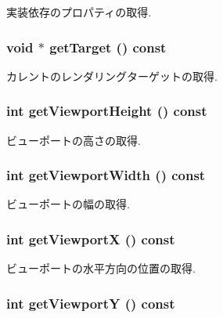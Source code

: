 実装依存のプロパティの取得. \hypertarget{classm3g_1_1Graphics3D_02d0033930c8e68f4d7ebd43abe7980a}{
\subsubsection[{getTarget}]{\setlength{\rightskip}{0pt plus 5cm}void $\ast$ getTarget () const}}
\label{classm3g_1_1Graphics3D_02d0033930c8e68f4d7ebd43abe7980a}


カレントのレンダリングターゲットの取得. \hypertarget{classm3g_1_1Graphics3D_d51e0c421126f5deb61b359cdb7dab2e}{
\subsubsection[{getViewportHeight}]{\setlength{\rightskip}{0pt plus 5cm}int getViewportHeight () const}}
\label{classm3g_1_1Graphics3D_d51e0c421126f5deb61b359cdb7dab2e}


ビューポートの高さの取得. \hypertarget{classm3g_1_1Graphics3D_768e5c057e2fa4c4b17a67134abbf89f}{
\subsubsection[{getViewportWidth}]{\setlength{\rightskip}{0pt plus 5cm}int getViewportWidth () const}}
\label{classm3g_1_1Graphics3D_768e5c057e2fa4c4b17a67134abbf89f}


ビューポートの幅の取得. \hypertarget{classm3g_1_1Graphics3D_af58b44cc6219f86c40dadb8a9377856}{
\subsubsection[{getViewportX}]{\setlength{\rightskip}{0pt plus 5cm}int getViewportX () const}}
\label{classm3g_1_1Graphics3D_af58b44cc6219f86c40dadb8a9377856}


ビューポートの水平方向の位置の取得. \hypertarget{classm3g_1_1Graphics3D_c21665afbf94a8f0153e099833c2b61a}{
\subsubsection[{getViewportY}]{\setlength{\rightskip}{0pt plus 5cm}int getViewportY () const}}
\label{classm3g_1_1Graphics3D_c21665afbf94a8f0153e099833c2b61a}


